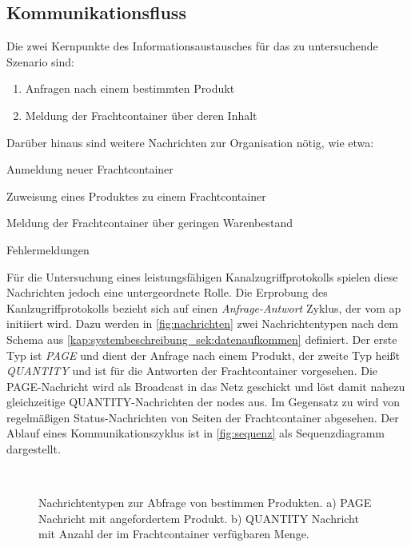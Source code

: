 \subsection{Kommunikationsfluss}
Die zwei Kernpunkte des Informationsaustausches für das zu untersuchende Szenario sind:
\begin{enumerate}
\item Anfragen nach einem bestimmten Produkt
\item Meldung der Frachtcontainer über deren Inhalt
\end{enumerate}
Darüber hinaus sind weitere Nachrichten zur Organisation nötig, wie etwa:
\begin{aenumerate}
\item Anmeldung neuer Frachtcontainer
\item Zuweisung eines Produktes zu einem Frachtcontainer
\item Meldung der Frachtcontainer über geringen Warenbestand
\item Fehlermeldungen
\end{aenumerate}
Für die Untersuchung eines leistungsfähigen Kanalzugriffprotokolls spielen diese Nachrichten jedoch eine untergeordnete Rolle. Die Erprobung des Kanlzugriffprotokolls bezieht sich auf einen \emph{Anfrage-Antwort} Zyklus, der vom \acs{ap} initiiert wird. Dazu werden in \autoref{fig:nachrichten} zwei Nachrichtentypen nach dem Schema aus \autoref{kap:systembeschreibung_sek:datenaufkommen} definiert. Der erste Typ ist \emph{PAGE} und dient der Anfrage nach einem Produkt, der zweite Typ heißt \emph{QUANTITY} und ist für die Antworten der Frachtcontainer vorgesehen. Die PAGE-Nachricht wird als Broadcast in das Netz geschickt und löst damit nahezu gleichzeitige QUANTITY-Nachrichten der \glspl{node} aus. Im Gegensatz zu \cite{inBinTestbed} wird von regelmäßigen Status-Nachrichten von Seiten der Frachtcontainer abgesehen. Der Ablauf eines Kommunikationszyklus ist in \autoref{fig:sequenz} als Sequenzdiagramm dargestellt.

\begin{figure}[bth]
        \myfloatalign
         \\
        \caption[Nachrichtentypen]{Nachrichtentypen zur Abfrage von bestimmen Produkten. a) PAGE Nachricht mit angefordertem Produkt. b) QUANTITY Nachricht mit Anzahl der im Frachtcontainer verfügbaren Menge.}\label{fig:nachrichten}
\end{figure}

